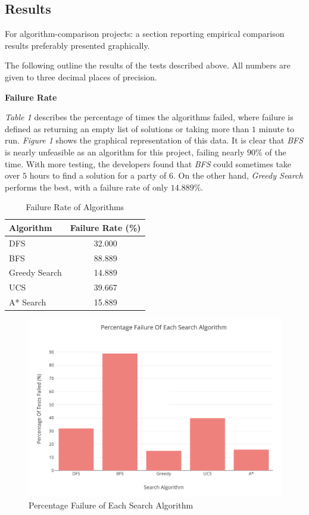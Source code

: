 \documentclass[11pt]{article}
\begin{document}
\subsection{Results}

 For algorithm-comparison projects: a section reporting empirical comparison results preferably presented graphically.

The following outline the results of the tests described above. All numbers are given to three decimal places of precision.

\textbf{Failure Rate}

\textit{Table 1} describes the percentage of times the algorithms failed, where failure is defined as returning an empty list of solutions or taking more than $1$ minute to run. \textit{Figure 1} shows the graphical representation of this data. It is clear that \textit{BFS} is nearly unfeasible as an  algorithm for this project, failing nearly $90\%$ of the time. With more testing, the developers found that \textit{BFS} could sometimes take over $5$ hours to find a solution for a party of $6$. On the other hand, \textit{Greedy Search} performs the best, with a failure rate of only $14.889\%$.

\begin{table}[!h]
  \centering
  \begin{tabular}{l c}
    \toprule
    Algorithm & Failure Rate (\%) \\
    \midrule
    DFS & 32.000 \\
    BFS & 88.889 \\
    Greedy Search & 14.889 \\
    UCS & 39.667 \\
    A* Search & 15.889 \\
    \bottomrule
  \end{tabular}
  \caption{Failure Rate of Algorithms}
\end{table}

\begin{figure}[!h]
\centering
\includegraphics[width=\textwidth]{fail_bar.png}
\caption{Percentage Failure of Each Search Algorithm}
\end{figure}
\end{document}
